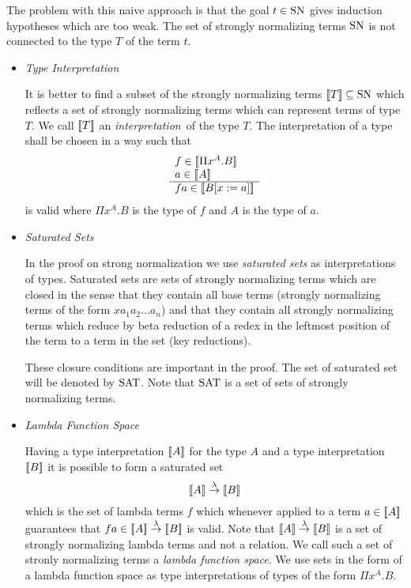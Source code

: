 The problem with this naive approach is that the goal $t \in \text{SN}$ gives
induction hypotheses which are too weak. The set of strongly normalizing terms
$\text{SN}$ is not connected to the type $T$ of the term $t$.

\begin{itemize}
    \item \emph{Type Interpretation}

        It is better to find a subset of the strongly normalizing terms ${{[\![} T {]\!]}} \subseteq \text{SN}$ which reflects a set of strongly normalizing terms
        which can represent terms of type $T$.  We call ${{[\![} T {]\!]}}$ an
        \emph{interpretation} of the type $T$. The interpretation of a type
        shall be chosen in a way such that
        $$
            \begin{array}{l} f \in {{[\![}\Pi x^A. B {]\!]}} \\ a \in {{[\![}A {]\!]}} \\ \hline fa \in {{[\![}B[x:=a] {]\!]}}\end{array}
        $$
        is valid where $\Pi x^A. B$ is the type of $f$ and $A$ is the type of
        $a$.

    \item \emph{Saturated Sets}

        In the proof on strong normalization we use \emph{saturated sets} as
        interpretations of types. Saturated sets are sets of strongly
        normalizing terms which are closed in the sense that they contain all
        base terms (strongly normalizing terms of the form $x a_1 a_2 \ldots
        a_n$) and that they contain all strongly normalizing terms which reduce
        by beta reduction of a redex in the leftmost position of the term to a
        term in the set (key reductions).

        These closure conditions are important in the proof.
        The set of saturated set will be denoted by $\text{SAT}$. Note that $\text{SAT}$ is
        a set of sets of strongly normalizing terms.

    \item \emph{Lambda Function Space}

        Having a type interpretation ${{[\![} A {]\!]}}$ for the type $A$ and a type
        interpretation ${{[\![} B {]\!]}}$ it is possible to form a saturated set
        $$
            {{[\![} A {]\!]}} \stackrel{\lambda}{\to} {{[\![} B {]\!]}}
        $$
        which is the set of lambda terms $f$ which whenever applied to a term $a
        \in {{[\![}A {]\!]}}$ guarantees that $fa \in {{[\![}A {]\!]}} \stackrel{\lambda}{\to} {{[\![} B {]\!]}}$ is
        valid. Note that ${{[\![} A {]\!]}} \stackrel{\lambda}{\to} {{[\![} B {]\!]}}$ is a set of strongly
        normalizing lambda terms and not a relation. We call such a set of
        stronly normalizing terms  a \emph{lambda function space}. We use sets
        in the form of a lambda function space as type interpretations of types
        of the form $\Pi x^A.B$.


\end{itemize}
